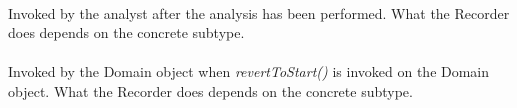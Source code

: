 \\
Invoked by the analyst after the analysis has been performed. What the
Recorder does depends on the concrete subtype. \\

\\ 
Invoked by the Domain object when {\em revertToStart()} is invoked on
the Domain object. What the Recorder does depends on the concrete subtype. 